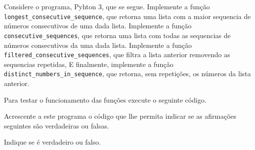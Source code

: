 \documentclass[12pt,varwidth=16cm,border=1pt]{standalone}
\begin{document}
Considere o programa, Pyhton 3, que se segue. Implemente a função \verb+longest_consecutive_sequence+, que retorna uma lista com a maior sequencia de números consecutivos de uma dada lista. Implemente a função \verb+consecutive_sequences+, que retorna uma lista com todas as sequencias de números consecutivos da uma dada lista. Implemente a função \verb+filtered_consecutive_sequences+, que filtra a lista anterior removendo as sequencias repetidas, E finalmente, implemente a função \verb+distinct_numbers_in_sequence+, que retorna, sem repetições, os números da lista anterior.



Para testar o funcionamento das funções execute o seguinte código.



Acrescente a este programa o código que lhe permita indicar se as
afirmações seguintes são verdadeiras ou falsas.

Indique se é verdadeiro ou falso.
\end{document}
